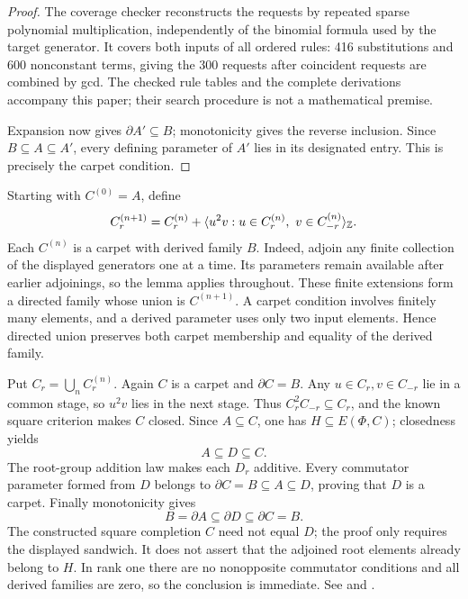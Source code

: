 \begin{proof}
The coverage checker reconstructs the requests by repeated sparse
polynomial multiplication, independently of the binomial formula
used by the target generator. It covers both inputs of all ordered
rules: 416 substitutions and 600 nonconstant terms, giving the
300 requests after coincident requests are combined by gcd.
The checked rule tables and the complete derivations accompany
this paper; their search procedure is not a mathematical premise.

Expansion now gives \(\partial A'\subseteq B\); monotonicity gives
the reverse inclusion. Since \(B\subseteq A\subseteq A'\), every
defining parameter of \(A'\) lies in its designated entry.
This is precisely the carpet condition.
\end{proof}

Starting with \(C^{(0)}=A\), define
\[
 C^{(n+1)}_r=C^{(n)}_r+
 \langle u^2v:u\in C^{(n)}_r,\ v\in C^{(n)}_{-r}\rangle_{\mathbb Z}.
\]
Each \(C^{(n)}\) is a carpet with derived family \(B\).
Indeed, adjoin any finite collection of the displayed generators
one at a time. Its parameters remain available after earlier
adjoinings, so the lemma applies throughout. These finite
extensions form a directed family whose union is \(C^{(n+1)}\).
A carpet condition involves finitely many elements, and a derived
parameter uses only two input elements. Hence directed union
preserves both carpet membership and equality of the derived family.

Put \(C_r=\bigcup_n C^{(n)}_r\). Again \(C\) is a carpet and
\(\partial C=B\). Any \(u\in C_r,v\in C_{-r}\) lie in a common
stage, so \(u^2v\) lies in the next stage. Thus \(C_r^2C_{-r}\subseteq
C_r\), and the known square criterion makes \(C\) closed.
Since \(A\subseteq C\), one has \(H\subseteq E(\Phi,C)\);
closedness yields
\[
 A\subseteq D\subseteq C.
\]
The root-group addition law makes each \(D_r\) additive.
Every commutator parameter formed from \(D\) belongs to
\(\partial C=B\subseteq A\subseteq D\), proving that \(D\) is
a carpet. Finally monotonicity gives
\[
 B=\partial A\subseteq\partial D\subseteq\partial C=B.
\]
The constructed square completion \(C\) need not equal \(D\);
the proof only requires the displayed sandwich. It does not assert
that the adjoined root elements already belong to \(H\).
In rank one there are no nonopposite commutator conditions and
all derived families are zero, so the conclusion is immediate.
See  and
.
